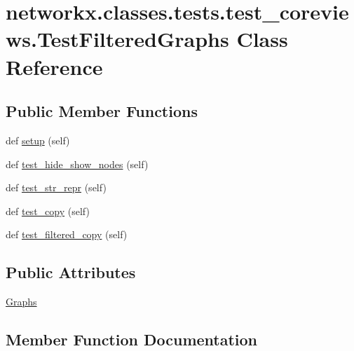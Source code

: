 \hypertarget{classnetworkx_1_1classes_1_1tests_1_1test__coreviews_1_1TestFilteredGraphs}{}\section{networkx.\+classes.\+tests.\+test\+\_\+coreviews.\+Test\+Filtered\+Graphs Class Reference}
\label{classnetworkx_1_1classes_1_1tests_1_1test__coreviews_1_1TestFilteredGraphs}
\subsection*{Public Member Functions}
\begin{DoxyCompactItemize}
\item 
def \hyperlink{classnetworkx_1_1classes_1_1tests_1_1test__coreviews_1_1TestFilteredGraphs_a124194f94ba796a000882573fe1ab793}{setup} (self)
\item 
def \hyperlink{classnetworkx_1_1classes_1_1tests_1_1test__coreviews_1_1TestFilteredGraphs_a06b43e493d9c465f865824db97635ed0}{test\+\_\+hide\+\_\+show\+\_\+nodes} (self)
\item 
def \hyperlink{classnetworkx_1_1classes_1_1tests_1_1test__coreviews_1_1TestFilteredGraphs_a8802904eda9bee7636af24268fc6b462}{test\+\_\+str\+\_\+repr} (self)
\item 
def \hyperlink{classnetworkx_1_1classes_1_1tests_1_1test__coreviews_1_1TestFilteredGraphs_ae5ffeb4b780f7db4f3e2c58513608221}{test\+\_\+copy} (self)
\item 
def \hyperlink{classnetworkx_1_1classes_1_1tests_1_1test__coreviews_1_1TestFilteredGraphs_aae8b456a7720b20063cbaf58e73d746f}{test\+\_\+filtered\+\_\+copy} (self)
\end{DoxyCompactItemize}
\subsection*{Public Attributes}
\begin{DoxyCompactItemize}
\item 
\hyperlink{classnetworkx_1_1classes_1_1tests_1_1test__coreviews_1_1TestFilteredGraphs_a6182d377597dcd596cf5c8cc911ab524}{Graphs}
\end{DoxyCompactItemize}


\subsection{Member Function Documentation}
\mbox{\label{classnetworkx_1_1classes_1_1tests_1_1test__coreviews_1_1TestFilteredGraphs_a124194f94ba796a000882573fe1ab793}} 
